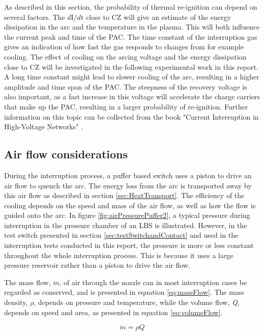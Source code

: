 \documentclass[10pt,b5paper,twoside]{article}
\begin{document}
As described in this section, the probability of thermal re-ignition can depend on several factors. The $d \mathrm{I}/d \mathrm{t}$ close to CZ will give an estimate of the energy dissipation in the arc and the temperature in the plasma. This will both influence the current peak and time of the PAC. The time constant of the interruption gas gives an indication of how fast the gas responds to changes from for example cooling. The effect of cooling on the arcing voltage and the energy dissipation close to CZ will be investigated in the following experimental work in this report. A long time constant might lead to slower cooling of the arc, resulting in a higher amplitude and time span of the PAC. The steepness of the recovery voltage is also important, as a fast increase in this voltage will accelerate the charge carriers that make up the PAC, resulting in a larger probability of re-ignition. Further information on this topic can be collected from the book "Current Interruption in High-Voltage Networks" \cite{bib:CIHVN}.


\subsection{Air flow considerations}
During the interruption process, a puffer based switch uses a piston to drive an air flow to quench the arc. The energy loss from the arc is transported away by this air flow as described in section \ref{sec:HeatTransport}. The efficiency of the cooling depends on the speed and mass of the air flow, as well as how the flow is guided onto the arc. In figure \ref{fig:airPressurePuffer2}, a typical pressure during interruption in the pressure chamber of an LBS is illustrated. However, in the test switch presented in section \ref{sec:testSwitchandContact} and used in the interruption tests conducted in this report, the pressure is more or less constant throughout the whole interruption process. This is because it uses a large pressure reservoir rather than a piston to drive the air flow.

The mass flow, $\dot{m}$, of air through the nozzle can in most interruption cases be regarded as conserved, and is presented in equation \eqref{eq:massFlow}. The mass density, $\rho$, depends on pressure and temperature, while the volume flow, \textit{Q}, depends on speed and area, as presented in equation \eqref{eq:volumeFlow}.

\begin{equation} \label{eq:massFlow}
\dot{m}=\rho Q
\end{equation} 
\end{document}
